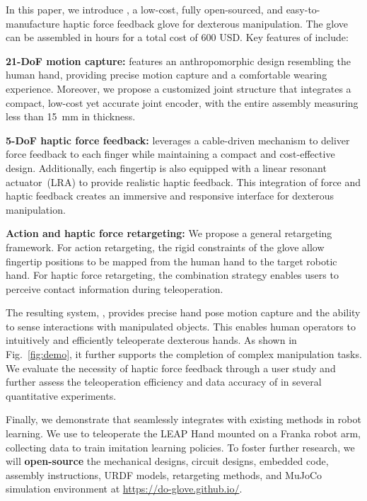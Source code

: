 In this paper, we introduce \textbf{\oursystem}, a low-cost, fully open-sourced, and easy-to-manufacture haptic force feedback glove for dexterous manipulation. The glove can be assembled in hours for a total cost of 600 USD. Key features of \oursystem include:

\textbf{21-DoF motion capture:} 
\oursystem features an anthropomorphic design resembling the human hand, providing precise motion capture and a comfortable wearing experience. Moreover, we propose a customized joint structure that integrates a compact, low-cost yet accurate joint encoder, with the entire assembly measuring less than 15~mm in thickness.

\textbf{5-DoF haptic force feedback:} 
\oursystem leverages a cable-driven mechanism to deliver force feedback to each finger while maintaining a compact and cost-effective design. Additionally, each fingertip is also equipped with a linear resonant actuator~(LRA) to provide realistic haptic feedback. This integration of force and haptic feedback creates an immersive and responsive interface for dexterous manipulation.

\textbf{Action and haptic force retargeting:} We propose a general retargeting framework. For action retargeting, the rigid constraints of the glove allow fingertip positions to be mapped from the human hand to the target robotic hand. For haptic force retargeting, the combination strategy enables users to perceive contact information during teleoperation.

The resulting system, \oursystem, provides precise hand pose motion capture and the ability to sense interactions with manipulated objects. This enables human operators to intuitively and efficiently teleoperate dexterous hands. As shown in Fig.~\ref{fig:demo}, it further supports the completion of complex manipulation tasks.
%
We evaluate the necessity of haptic force feedback through a user study and further assess the teleoperation efficiency and data accuracy of \oursystem in several quantitative experiments.

Finally, we demonstrate that \oursystem seamlessly integrates with existing methods in robot learning. We use \oursystem to teleoperate the LEAP Hand mounted on a Franka robot arm, collecting data to train imitation learning policies. To foster further research, we will \textbf{open-source} the mechanical designs, circuit designs, embedded code, assembly instructions, URDF models, retargeting methods, and MuJoCo simulation environment at \textcolor{cyan}{\url{https://do-glove.github.io/}}.